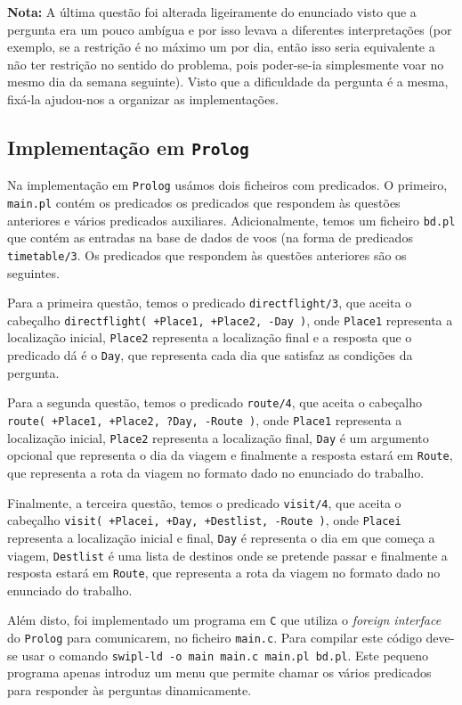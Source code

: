 \documentclass[12pt,a4paper,oneside]{article}
\begin{document}
\textbf{Nota:} A última questão foi alterada ligeiramente do enunciado
visto que a pergunta era um pouco ambígua e por isso levava a
diferentes interpretações (por exemplo, se a restrição é no máximo um
por dia, então isso seria equivalente a não ter restrição no sentido
do problema, pois poder-se-ia simplesmente voar no mesmo dia da semana
seguinte). Visto que a dificuldade da pergunta é a mesma, fixá-la
ajudou-nos a organizar as implementações.

\subsection{Implementação em \texttt{Prolog}}

Na implementação em \texttt{Prolog} usámos dois ficheiros com
predicados. O primeiro, \texttt{main.pl} contém os predicados os
predicados que respondem às questões anteriores e vários predicados
auxiliares. Adicionalmente, temos um ficheiro \texttt{bd.pl} que
contém as entradas na base de dados de voos (na forma de predicados
\texttt{timetable/3}. Os predicados que respondem às questões
anteriores são os seguintes.

Para a primeira questão, temos o predicado \texttt{directflight/3}, que
aceita o cabeçalho \texttt{directflight( +Place1, +Place2, -Day )}, onde
\texttt{Place1} representa a localização inicial, \texttt{Place2}
representa a localização final e a resposta que o predicado dá é o
\texttt{Day}, que representa cada dia que satisfaz as condições da
pergunta.

Para a segunda questão, temos o predicado \texttt{route/4}, que aceita
o cabeçalho \texttt{route( +Place1, +Place2, ?Day, -Route )}, onde
\texttt{Place1} representa a localização inicial, \texttt{Place2}
representa a localização final, \texttt{Day} é um argumento opcional
que representa o dia da viagem e finalmente a resposta estará em
\texttt{Route}, que representa a rota da viagem no formato dado no
enunciado do trabalho.

Finalmente, a terceira questão, temos o predicado \texttt{visit/4},
que aceita o cabeçalho \texttt{visit( +Placei, +Day, +Destlist,
  -Route )}, onde \texttt{Placei} representa a localização inicial e
final, \texttt{Day} é representa o dia em que começa a viagem,
\texttt{Destlist} é uma lista de destinos onde se pretende passar e
finalmente a resposta estará em \texttt{Route}, que representa a rota
da viagem no formato dado no enunciado do trabalho.

Além disto, foi implementado um programa em \texttt{C} que utiliza o
\textit{foreign interface} do \texttt{Prolog} para comunicarem, no
ficheiro \texttt{main.c}. Para compilar este código deve-se usar o
comando \texttt{swipl-ld -o main main.c main.pl bd.pl}. Este pequeno
programa apenas introduz um menu que permite chamar os vários
predicados para responder às perguntas dinamicamente.
\end{document}
